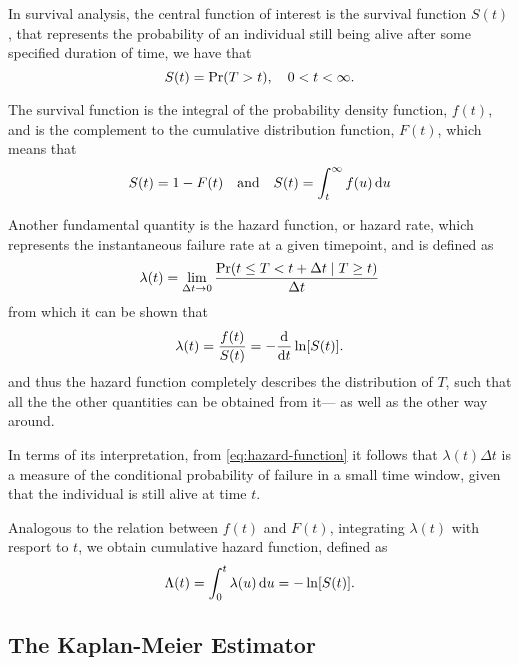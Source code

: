 In survival analysis, 
the central function of interest is 
the survival function \(S(t)\), 
that represents the probability 
of an individual still being alive after 
some specified duration of time, we have that 
%
\begin{equation}
    S(t) = \operatorname{\Pr} (T > t), \quad 0 < t < \infty.
\end{equation}

The survival function is 
the integral of the probability density function, \(f(t)\),
and is the complement to the cumulative distribution function, \(F(t)\),
which means that
~\autocite{kleinSurvival2003}
%
\begin{equation}
    S(t) = 1 - F(t) 
    \quad \text{and} \quad 
    S(t) = \int_{t}^{\infty} f(u) \, \mathrm{d} u
\end{equation}

Another fundamental quantity is the hazard function, or hazard rate,
which represents the instantaneous failure rate at a given timepoint,
and is defined as
%
\begin{equation}
    \label{eq:hazard-function}
    \lambda(t) = \lim_{\Delta t \to 0} 
        \frac{\PR (t \leq T < t + \Delta t \mid T \geq t)}{\Delta t}
\end{equation}
% 
from which it can be shown that
~\autocite{kleinSurvival2003}
%
\begin{equation}
    \lambda(t) = \frac{f(t)}{S(t)} = -\frac{\mathrm{d}}{\mathrm{d} t} \ln[S(t)].
\end{equation}
%
and thus the hazard function completely describes the distribution of \(T\),
such that all the the other quantities can be obtained from it---%
as well as the other way around.

In terms of its interpretation, 
from \cref{eq:hazard-function} it follows that \(\lambda(t)\Delta t\) 
is a measure of the conditional probability of failure in a small time
window, given that the individual is still alive at time \(t\).
~\autocite{kleinSurvival2003}

Analogous to the relation between \(f(t)\) and \(F(t)\), 
integrating \(\lambda(t)\) with resport to \(t\),
we obtain cumulative hazard function, defined as
%
\begin{equation}
    \Lambda(t) = \int_{0}^{t} \lambda(u) \, \mathrm{d} u = -\ln[S(t)].
\end{equation}

\subsection{The Kaplan-Meier Estimator}

